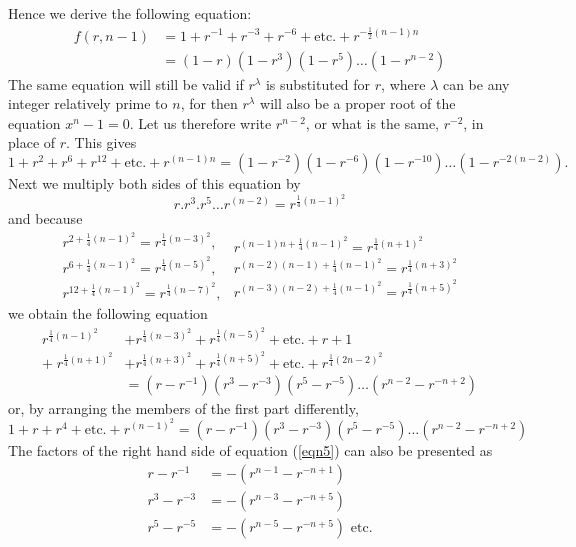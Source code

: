 \documentclass{book}
\theoremstyle{plain}
\theoremstyle{remark}
\begin{document}
Hence we derive the following equation:
\begin{align*} f(r,n-1) &= 1 + r^{-1} + r^{-3} + r^{-6} + \textrm{etc.} + r^{-\frac{1}{2}(n-1)n} \\
&= (1-r)(1-r^3)(1-r^5)\dots(1-r^{n-2}) \end{align*}
The same equation will still be valid if $r^{\lambda}$ is substituted for $r$, where $\lambda$ can be any integer relatively prime to $n$, for then $r^{\lambda}$ will also be a proper root of the equation $x^n-1=0$.  Let us therefore write $r^{n-2}$, or what is the same, $r^{-2}$, in place of $r$.  This gives
\[ 1 + r^2 + r^6 + r^{12} + \textrm{etc.} + r^{(n-1)n} = (1-r^{-2})(1-r^{-6})(1-r^{-10})\dots(1-r^{-2(n-2)}). \]
Next we multiply both sides of this equation by 
\[ r.r^3.r^5 \dots r^{(n-2)} = r^{\frac{1}{4}(n-1)^2} \]
and because
\[ \begin{array}{r}
r^{2 + \frac{1}{4}(n-1)^2} = r^{\frac{1}{4}(n-3)^2}, \\
r^{6 + \frac{1}{4}(n-1)^2} = r^{\frac{1}{4}(n-5)^2}, \\
r^{12 + \frac{1}{4}(n-1)^2} = r^{\frac{1}{4}(n-7)^2}, 
\end{array}
\begin{array}{r}
r^{(n-1)n+\frac{1}{4}(n-1)^2} = r^{\frac{1}{4}(n+1)^2} \\
 r^{(n-2)(n-1)+\frac{1}{4}(n-1)^2} = r^{\frac{1}{4}(n+3)^2} \\
  r^{(n-3)(n-2)+\frac{1}{4}(n-1)^2} = r^{\frac{1}{4}(n+5)^2} 
  \end{array} \]
we obtain the following equation
\begin{align*}
r^{\frac{1}{4}(n-1)^2} &+ r^{\frac{1}{4}(n-3)^2} + r^{\frac{1}{4}(n-5)^2} + \textrm{etc.} + r + 1 \\
+\; r^{\frac{1}{4}(n+1)^2} &+ r^{\frac{1}{4}(n+3)^2} + r^{\frac{1}{4}(n+5)^2}+ \textrm{etc.} + r^{\frac{1}{4}(2n-2)^2} \\
&=(r-r^{-1})(r^3-r^{-3})(r^5-r^{-5})\dots(r^{n-2}-r^{-n+2}) 
\end{align*}
or, by arranging the members of the first part differently, 
\begin{equation} 1 + r+ r^4 + \textrm{etc.} + r^{(n-1)^2} = (r-r^{-1})(r^3-r^{-3})(r^5-r^{-5})\dots(r^{n-2}-r^{-n+2})  \label{eqn5}\end{equation}
The factors of the right hand side of equation (\ref{eqn5}) can also be presented as
\begin{align*} 
r-r^{-1} &= - (r^{n-1}-r^{-n+1}) \\
r^3-r^{-3} &= - (r^{n-3}-r^{-n+5}) \\
r^5-r^{-5} &= - (r^{n-5}-r^{-n+5}) \textrm{ etc.}\\
\end{align*}
\end{document}
